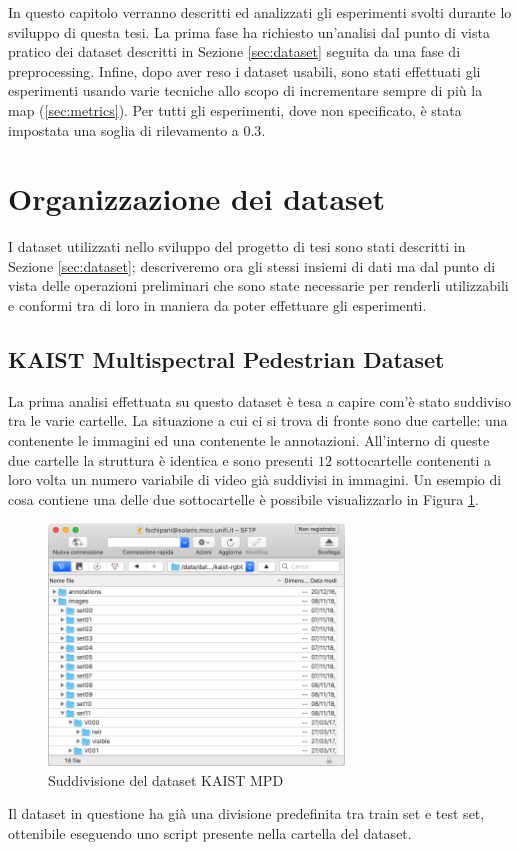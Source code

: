 \label{chap:experiment}
In questo capitolo verranno descritti ed analizzati gli esperimenti svolti durante lo sviluppo di questa tesi. La prima fase ha richiesto un'analisi dal punto di vista pratico dei dataset descritti in Sezione \ref{sec:dataset} seguita da una fase di preprocessing. 
Infine, dopo aver reso i dataset usabili, sono stati effettuati gli esperimenti usando varie tecniche allo scopo di incrementare sempre di più la \acl{map} (\ref{sec:metrics}). Per tutti gli esperimenti, dove non specificato, è stata impostata una soglia di rilevamento a $0.3$.
\section{Organizzazione dei dataset}
\label{sec:dataset_org}
I dataset utilizzati nello sviluppo del progetto di tesi sono stati descritti in Sezione \ref{sec:dataset}; descriveremo ora gli stessi insiemi di dati ma dal punto di vista delle operazioni preliminari che sono state necessarie per renderli utilizzabili e conformi tra di loro in maniera da poter effettuare gli esperimenti. 
\subsection{KAIST Multispectral Pedestrian Dataset}
\label{subsec:kaist_experiment}
La prima analisi effettuata su questo dataset è tesa a capire com'è stato suddiviso tra le varie cartelle. La situazione a cui ci si trova di fronte sono due cartelle: una contenente le immagini ed una contenente le annotazioni. All'interno di queste due cartelle la struttura è identica e sono presenti $12$ sottocartelle contenenti a loro volta un numero variabile di video già suddivisi in immagini. Un esempio di cosa contiene una delle due sottocartelle è possibile visualizzarlo in Figura \ref{fig:kaist_dataset_folder}.
\begin{figure}
    \centering
    \includegraphics[width=0.7\textwidth]{images/screen_kaist.png}
    \caption{Suddivisione del dataset KAIST MPD}
    \label{fig:kaist_dataset_folder}
\end{figure} 
Il dataset in questione ha già una divisione predefinita tra train set e test set, ottenibile eseguendo uno script presente nella cartella del dataset. 

